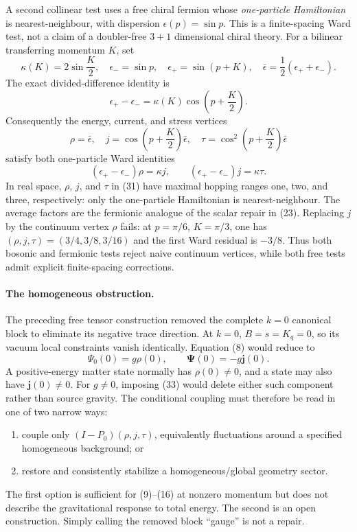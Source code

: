 A second collinear test uses a free chiral fermion whose \emph{one-particle
Hamiltonian} is nearest-neighbour, with dispersion $\epsilon(p)=\sin p$.
This is a finite-spacing Ward test, not a claim of a doubler-free $3+1$
dimensional chiral theory.  For a
bilinear transferring momentum $K$, set
\[
 \kappa(K)=2\sin\frac K2,\quad
 \epsilon_- =\sin p,\quad \epsilon_+=\sin(p+K),\quad
 \bar\epsilon=\frac12(\epsilon_++\epsilon_-).     \tag{29}
\]
The exact divided-difference identity is
\[
 \epsilon_+-\epsilon_-
 =\kappa(K)\cos\left(p+\frac K2\right).            \tag{30}
\]
Consequently the energy, current, and stress vertices
\[
 \rho=\bar\epsilon,\quad
 j=\cos\left(p+\frac K2\right)\bar\epsilon,\quad
 \tau=\cos^2\left(p+\frac K2\right)\bar\epsilon  \tag{31}
\]
satisfy both one-particle Ward identities
\[
 (\epsilon_+-\epsilon_-)\rho=\kappa j,\qquad
 (\epsilon_+-\epsilon_-)j=\kappa\tau.             \tag{32}
\]
In real space, $\rho$, $j$, and $\tau$ in (31) have maximal hopping ranges
one, two, and three, respectively: only the one-particle Hamiltonian is
nearest-neighbour.  The average factors are the fermionic analogue of the
scalar repair in (23).
Replacing $j$ by the continuum vertex $\rho$ fails: at
$p=\pi/6$, $K=\pi/3$, one has
$(\rho,j,\tau)=(3/4,3/8,3/16)$ and the first Ward residual is $-3/8$.
Thus both bosonic and fermionic tests reject naive continuum vertices, while
both free tests admit explicit finite-spacing corrections.

\paragraph{The homogeneous obstruction.}

The preceding free tensor construction removed the complete $k=0$ canonical
block to eliminate its negative trace direction.  At $k=0$,
$B=s=K_q=0$, so its vacuum local constraints vanish identically.  Equation
(8) would reduce to
\[
 \Psi_0(0)=g\rho(0),\qquad \boldsymbol\Psi(0)=-g\boldsymbol j(0). \tag{33}
\]
A positive-energy matter state normally has $\rho(0)\ne0$, and a state may
also have $\boldsymbol j(0)\ne0$.  For $g\ne0$, imposing (33) would delete either
such component rather than source gravity.  The conditional coupling must
therefore be read in one of two narrow ways:
\begin{enumerate}[label=(\alph*),leftmargin=2em]
\item couple only $(I-P_0)(\rho,j,\tau)$, equivalently fluctuations around a
specified homogeneous background; or
\item restore and consistently stabilize a homogeneous/global geometry sector.
\end{enumerate}
The first option is sufficient for (9)--(16) at nonzero momentum but does not
describe the gravitational response to total energy.  The second is an open
construction.  Simply calling the removed block ``gauge'' is not a repair.

